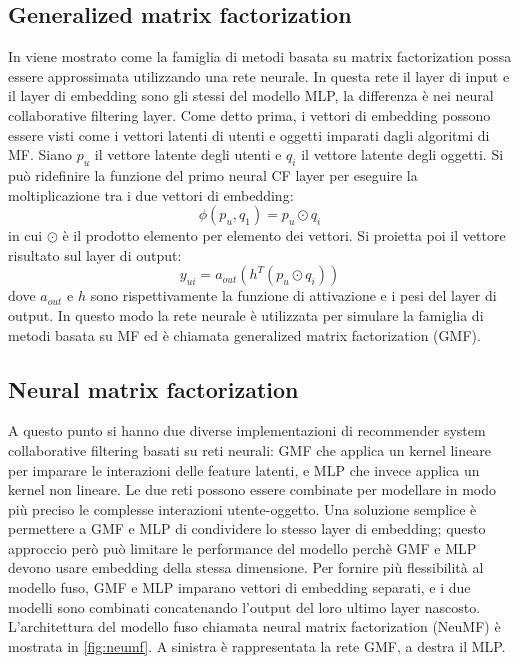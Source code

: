 \subsection{Generalized matrix factorization}
In \cite{NCF} viene mostrato come la famiglia di metodi basata su matrix factorization possa essere approssimata utilizzando una rete neurale. In questa rete il layer di input e il layer di embedding sono gli stessi del modello MLP, la differenza è nei neural collaborative filtering layer. Come detto prima, i vettori di embedding possono essere visti come i vettori latenti di utenti e oggetti imparati dagli algoritmi di MF. Siano $p_u$ il vettore latente degli utenti e $q_i$ il vettore latente degli oggetti. Si può ridefinire la funzione del primo neural CF layer per eseguire la moltiplicazione tra i due vettori di embedding:
$$
\phi(p_u, q_1) = p_u \odot q_i
$$
in cui $\odot$ è il prodotto elemento per elemento dei vettori. Si proietta poi il vettore risultato sul layer di output:
$$
y_{ui} = a_{out}(h^T(p_u \odot q_i))
$$
dove $a_{out}$ e $h$ sono rispettivamente la funzione di attivazione e  i pesi del layer di output. In questo modo la rete neurale è utilizzata per simulare la famiglia di metodi basata su MF ed è chiamata generalized matrix factorization (GMF).

\subsection{Neural matrix factorization}
A questo punto si hanno due diverse implementazioni di recommender system collaborative filtering basati su reti neurali: GMF che applica un kernel lineare per imparare le interazioni delle feature latenti, e MLP che invece applica un kernel non lineare. Le due reti possono essere combinate per modellare in modo più preciso le complesse interazioni utente-oggetto. Una soluzione semplice è permettere a GMF e MLP di condividere lo stesso layer di embedding; questo approccio però può limitare le performance del modello perchè GMF e MLP devono usare embedding della stessa dimensione. Per fornire più flessibilità al modello fuso, GMF e MLP imparano vettori di embedding separati, e i due modelli sono combinati concatenando l'output del loro ultimo layer nascosto. L'architettura del modello fuso chiamata neural matrix factorization (NeuMF) è mostrata in \autoref{fig:neumf}. A sinistra è rappresentata la rete GMF, a destra il MLP.

